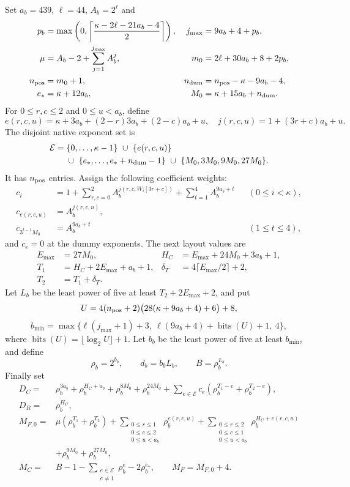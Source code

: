 \documentclass[11pt]{article}
\newcommand{\bits}{\operatorname{bits}}
\begin{document}
Set $a_b=439$, $\ell=44$, $A_b=2^\ell$ and
\begin{align*}
p_b&=\max\left(0,\left\lceil\frac{\kappa-2\ell-21a_b-4}{2}\right\rceil\right),&
j_{\max}&=9a_b+4+p_b,\\
\mu&=A_b-2+\sum_{j=1}^{j_{\max}}A_b^j,&
m_0&=2\ell+30a_b+8+2p_b,\\
n_{\rm pos}&=m_0+1,&n_{\rm dum}&=n_{\rm pos}-\kappa-9a_b-4,\\
e_*&=\kappa+12a_b,&M_0&=\kappa+15a_b+n_{\rm dum}.
\end{align*}
For $0\leq r,c\leq2$ and $0\leq u<a_b$, define
\[
e(r,c,u)=\kappa+3a_b+(2-r)3a_b+(2-c)a_b+u,
\quad j(r,c,u)=1+(3r+c)a_b+u.
\]
The disjoint native exponent set is
\begin{align*}
\mathcal E={}&\{0,\ldots,\kappa-1\}\ \cup\ \{e(r,c,u)\}\\
&\cup\ \{e_*,\ldots,e_*+n_{\rm dum}-1\}\ \cup\ \{M_0,3M_0,9M_0,27M_0\}.
\end{align*}
It has $n_{\rm pos}$ entries. Assign the following coefficient weights:
\begin{align*}
c_i&=1+\sum_{r,c=0}^2A_b^{j(r,c,W_i[3r+c])}+\sum_{t=1}^4A_b^{9a_b+t}
&& (0\leq i<\kappa),\\
c_{e(r,c,u)}&=A_b^{j(r,c,u)},\\
c_{3^{t-1}M_0}&=A_b^{9a_b+t}&&(1\leq t\leq4),
\end{align*}
and $c_e=0$ at the dummy exponents. The next layout values are
\begin{align*}
E_{\max}&=27M_0,&H_C&=E_{\max}+24M_0+3a_b+1,\\
T_1&=H_C+2E_{\max}+a_b+1,&
\delta_T&=4\lceil E_{\max}/2\rceil+2,\\
T_2&=T_1+\delta_T.
\end{align*}
Let $L_b$ be the least power of five at least $T_2+2E_{\max}+2$, and put
\[
U=4(n_{\rm pos}+2)\bigl(28(\kappa+9a_b+4)+6\bigr)+8,
\]
\[
b_{\min}=\max\{\ell(j_{\max}+1)+3,\ \ell(9a_b+4)+\bits(U)+1,\ 4\},
\]
where $\bits(U)=\lfloor\log_2U\rfloor+1$. Let $b_b$ be the least power of five at least $b_{\min}$, and define
\[
\rho_b=2^{b_b},\qquad d_b=b_bL_b,\qquad B=\rho_b^{L_b}.
\]
Finally set
\begin{align*}
D_C={}&\rho_b^{3a_b}+\rho_b^{H_C+a_b}+\rho_b^{8M_0}+\rho_b^{24M_0}
 +\sum_{e\in\mathcal E}c_e(\rho_b^{T_1-e}+\rho_b^{T_2-e}),\\
D_R={}&\rho_b^{H_C},\\
M_{F,0}={}&\mu(\rho_b^{T_1}+\rho_b^{T_2})
 +\sum_{\substack{0\leq r\leq1\\0\leq c\leq2\\0\leq u<a_b}}\rho_b^{e(r,c,u)}
 +\sum_{\substack{0\leq r\leq2\\0\leq c\leq1\\0\leq u<a_b}}\rho_b^{H_C+e(r,c,u)}\\
&+\rho_b^{9M_0}+\rho_b^{27M_0},\\
M_C={}&B-1-\sum_{\substack{e\in\mathcal E\\e\ne1}}\rho_b^e-2\rho_b^{e_*},
\qquad M_F=M_{F,0}+4.
\end{align*}
\end{document}
